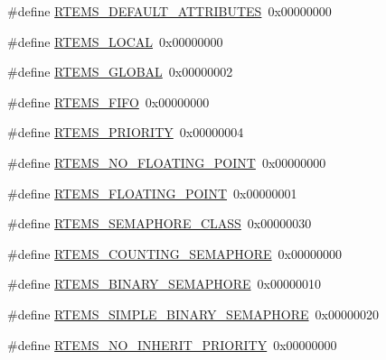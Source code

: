 \begin{DoxyCompactItemize}
\item 
\#define \mbox{\hyperlink{group__ClassicAttributes_gae5dc2c331679bb5da53ab70010061252}{R\+T\+E\+M\+S\+\_\+\+D\+E\+F\+A\+U\+L\+T\+\_\+\+A\+T\+T\+R\+I\+B\+U\+T\+ES}}~0x00000000
\item 
\#define \mbox{\hyperlink{group__ClassicAttributes_ga12f6eed44135cc4b948bb03f01c97b27}{R\+T\+E\+M\+S\+\_\+\+L\+O\+C\+AL}}~0x00000000
\item 
\#define \mbox{\hyperlink{group__ClassicAttributes_ga2c0c459a320511d71b3390e916a1d3f0}{R\+T\+E\+M\+S\+\_\+\+G\+L\+O\+B\+AL}}~0x00000002
\item 
\#define \mbox{\hyperlink{group__ClassicAttributes_gabff683ea2ab213fbfcf31290fce611dc}{R\+T\+E\+M\+S\+\_\+\+F\+I\+FO}}~0x00000000
\item 
\#define \mbox{\hyperlink{group__ClassicAttributes_ga8e38aee651d2ccf2d44b70eb9b570e52}{R\+T\+E\+M\+S\+\_\+\+P\+R\+I\+O\+R\+I\+TY}}~0x00000004
\item 
\#define \mbox{\hyperlink{group__ClassicAttributes_ga514fb0bc840344fb4b221b646a30f5c2}{R\+T\+E\+M\+S\+\_\+\+N\+O\+\_\+\+F\+L\+O\+A\+T\+I\+N\+G\+\_\+\+P\+O\+I\+NT}}~0x00000000
\item 
\#define \mbox{\hyperlink{group__ClassicAttributes_gac0368fd84c0d3e0f969d72afc5126881}{R\+T\+E\+M\+S\+\_\+\+F\+L\+O\+A\+T\+I\+N\+G\+\_\+\+P\+O\+I\+NT}}~0x00000001
\item 
\#define \mbox{\hyperlink{group__ClassicAttributes_ga32cf23b1d18f4f599e9211aff2a09c45}{R\+T\+E\+M\+S\+\_\+\+S\+E\+M\+A\+P\+H\+O\+R\+E\+\_\+\+C\+L\+A\+SS}}~0x00000030
\item 
\#define \mbox{\hyperlink{group__ClassicAttributes_ga09ff2d373208ebd2a689b268727925c2}{R\+T\+E\+M\+S\+\_\+\+C\+O\+U\+N\+T\+I\+N\+G\+\_\+\+S\+E\+M\+A\+P\+H\+O\+RE}}~0x00000000
\item 
\#define \mbox{\hyperlink{group__ClassicAttributes_ga4830461f6c4f129656c30ed185083c07}{R\+T\+E\+M\+S\+\_\+\+B\+I\+N\+A\+R\+Y\+\_\+\+S\+E\+M\+A\+P\+H\+O\+RE}}~0x00000010
\item 
\#define \mbox{\hyperlink{group__ClassicAttributes_gaa806ca5ba678b04af0e288363410d39a}{R\+T\+E\+M\+S\+\_\+\+S\+I\+M\+P\+L\+E\+\_\+\+B\+I\+N\+A\+R\+Y\+\_\+\+S\+E\+M\+A\+P\+H\+O\+RE}}~0x00000020
\item 
\#define \mbox{\hyperlink{group__ClassicAttributes_gab47fe6a8c45288f5c27e5a7ceb7c71ed}{R\+T\+E\+M\+S\+\_\+\+N\+O\+\_\+\+I\+N\+H\+E\+R\+I\+T\+\_\+\+P\+R\+I\+O\+R\+I\+TY}}~0x00000000
\item 

\end{DoxyCompactItemize}
